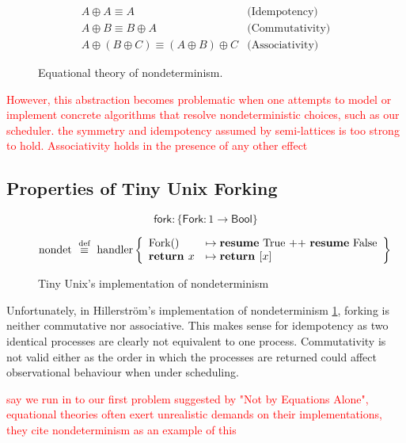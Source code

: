\documentclass[logo,bsc,singlespacing,parskip]{infthesis}
\begin{document}
\begin{figure}[H]
\centering
\[
\begin{array}{ll}
  A \oplus A \equiv A & \text{(Idempotency)} \\
  A \oplus B \equiv B \oplus A & \text{(Commutativity)} \\
  A \oplus (B \oplus C) \equiv (A \oplus B) \oplus C & \text{(Associativity)}
\end{array}
\]
\caption{%
  Equational theory of nondeterminism.
}
\end{figure}





\textcolor{red}{However, this abstraction becomes problematic when one attempts to model or implement concrete algorithms that resolve nondeterministic choices, such as our scheduler.  the symmetry and idempotency assumed by semi-lattices is too strong to hold. Associativity holds in the presence of any other effect \cite{NotByEquationsAlone}}



\subsection{Properties of Tiny Unix Forking}


\begin{figure}[H]
\centering
\[
\mathsf{fork} : \{ \mathsf{Fork} : 1 \rightarrow \mathsf{Bool} \}
\]

\[
\text{nondet} \ \overset{\text{def}}{\equiv} \ \text{handler} \left\{
\begin{array}{ll}
\text{Fork}() &\mapsto \text{\textbf{resume} True ++ \textbf{resume} False} \\
\textbf{return } x &\mapsto \textbf{return } [x]
\end{array}
\right\}
\]
\caption{Tiny Unix's implementation of nondeterminism}
\label{nondetImplementation}
\end{figure}


Unfortunately, in Hillerström's implementation of nondeterminism \ref{nondetImplementation}, forking is neither commutative nor associative. This makes sense for idempotency as two identical processes are clearly not equivalent to one process. Commutativity is not valid either as the order in which the processes are returned could affect observational behaviour when under scheduling.

\textcolor{red}{say we run in to our first problem suggested by "Not by Equations Alone", equational theories often exert unrealistic demands on their implementations, they cite nondeterminism as an example of this}
\end{document}
